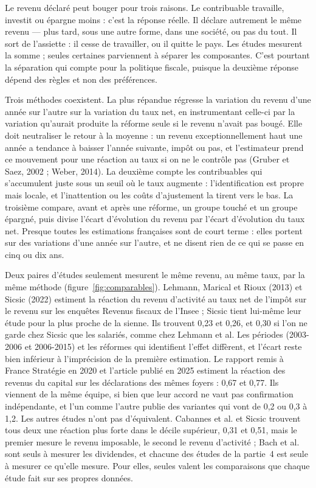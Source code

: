 \documentclass[11pt,a4paper]{article}
\begin{document}
Le revenu déclaré peut bouger pour trois raisons. Le contribuable travaille, investit ou épargne
moins : c'est la réponse réelle. Il déclare autrement le même revenu --- plus tard, sous une autre
forme, dans une société, ou pas du tout. Il sort de l'assiette : il cesse de travailler, ou il quitte
le pays. Les études mesurent la somme ; seules certaines parviennent à séparer les composantes. C'est
pourtant la séparation qui compte pour la politique fiscale, puisque la deuxième réponse dépend des
règles et non des préférences.

Trois méthodes coexistent. La plus répandue régresse la variation du revenu d'une année sur l'autre
sur la variation du taux net, en instrumentant celle-ci par la variation qu'aurait produite la
réforme seule si le revenu n'avait pas bougé. Elle doit neutraliser le retour à la moyenne : un
revenu exceptionnellement haut une année a tendance à baisser l'année suivante, impôt ou pas, et
l'estimateur prend ce mouvement pour une réaction au taux si on ne le contrôle pas (Gruber et Saez,
2002 ; Weber, 2014). La deuxième compte les contribuables qui s'accumulent juste sous un seuil où le
taux augmente : l'identification est propre mais locale, et l'inattention ou les coûts d'ajustement
la tirent vers le bas. La troisième compare, avant et après une réforme, un groupe touché et un
groupe épargné, puis divise l'écart d'évolution du revenu par l'écart d'évolution du taux net.
Presque toutes les estimations françaises sont de court terme : elles portent sur des variations
d'une année sur l'autre, et ne disent rien de ce qui se passe en cinq ou dix ans.

Deux paires d'études seulement mesurent le même revenu, au même taux, par la même méthode
(figure~\ref{fig:comparables}). Lehmann, Marical et Rioux (2013) et Sicsic (2022) estiment la
réaction du revenu d'activité au taux net de l'impôt sur le revenu sur les enquêtes Revenus fiscaux
de l'Insee ; Sicsic tient lui-même leur étude pour la plus proche de la sienne. Ils trouvent 0,23 et
0,26, et 0,30 si l'on ne garde chez Sicsic que les salariés, comme chez Lehmann et al. Les périodes
(2003-2006 et 2006-2015) et les réformes qui identifient l'effet diffèrent, et l'écart reste bien
inférieur à l'imprécision de la première estimation. Le rapport remis à France Stratégie en 2020 et
l'article publié en 2025 estiment la réaction des revenus du capital sur les déclarations des mêmes
foyers : 0,67 et 0,77. Ils viennent de la même équipe, si bien que leur accord ne vaut pas
confirmation indépendante, et l'un comme l'autre publie des variantes qui vont de 0,2 ou 0,3 à 1,2.
Les autres études n'ont pas d'équivalent. Cabannes et al. et Sicsic trouvent tous deux une réaction
plus forte dans le décile supérieur, 0,31 et 0,51, mais le premier mesure le revenu imposable, le
second le revenu d'activité ; Bach et al. sont seuls à mesurer les dividendes, et chacune des études
de la partie~4 est seule à mesurer ce qu'elle mesure. Pour elles, seules valent les comparaisons
que chaque étude fait sur ses propres données.
\end{document}
